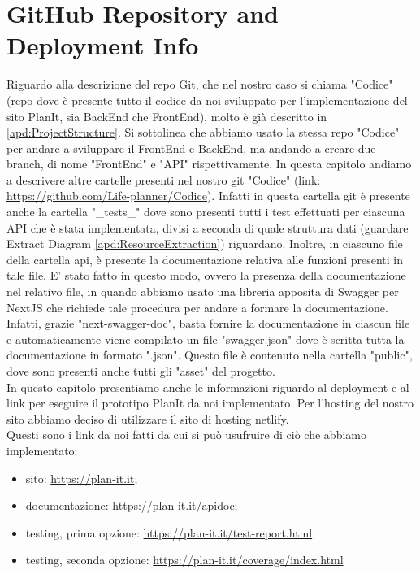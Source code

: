 \section{GitHub Repository and Deployment Info}
\label{secD4:GitHubRepositoryAndDeploymentInfo}
Riguardo alla descrizione del repo Git, che nel nostro caso si chiama "Codice" (repo dove è presente tutto il codice da noi sviluppato per l'implementazione del sito PlanIt, sia BackEnd che FrontEnd), molto è già descritto in \ref{apd:ProjectStructure}. Si sottolinea che abbiamo usato la stessa repo "Codice" per andare a sviluppare il FrontEnd e BackEnd, ma andando a creare due branch, di nome "FrontEnd" e "API" rispettivamente. In questa capitolo andiamo a descrivere altre cartelle presenti nel nostro git "Codice" (link: \href{https://github.com/Life-planner/Codice} {https://github.com/Life-planner/Codice}). Infatti in questa cartella git è presente anche la cartella "\_tests\_" dove sono presenti tutti i test effettuati per ciascuna API che è stata implementata, divisi a seconda di quale struttura dati (guardare Extract Diagram \ref{apd:ResourceExtraction}) riguardano. Inoltre, in  ciascuno file della cartella api, è presente la documentazione relativa alle funzioni presenti in tale file. E' stato fatto in questo modo, ovvero la presenza della documentazione nel relativo file, in quando abbiamo usato una libreria apposita di Swagger per NextJS che richiede tale procedura per andare a formare la documentazione. Infatti, grazie "next-swagger-doc", basta fornire la documentazione in ciascun file e automaticamente viene compilato un file "swagger.json" dove è scritta tutta la documentazione in formato ".json". Questo file è contenuto nella cartella "public", dove sono presenti anche tutti gli "asset" del progetto.\\
In questo capitolo presentiamo anche le informazioni riguardo al deployment e al link per eseguire il prototipo PlanIt da noi implementato. Per l'hosting del nostro sito abbiamo deciso di utilizzare il sito di hosting netlify. \\ Questi sono i link da noi fatti da cui si può usufruire di ciò che abbiamo implementato:
\begin{itemize}
    \begin{comment}
    \item main branch: \href{https://plan-it.it} {https://plan-it.it};
    \item api branch: \href{https://api.plan-it.it} {https://api.plan-it.it};
    \item frontend branch: \href{https://frontend.plan-it.it} {https://frontend.plan-it.it};
    \end{comment}
    \item sito: \href{https://plan-it.it} {https://plan-it.it};
    \item documentazione: \href{https://plan-it.it/apidoc} {https://plan-it.it/apidoc};
    \item testing, prima opzione: \href{https://plan-it.it/test-report.html} {https://plan-it.it/test-report.html}
    \item testing, seconda opzione: \href{https://plan-it.it/coverage/index.html} {https://plan-it.it/coverage/index.html}

\end{itemize}
